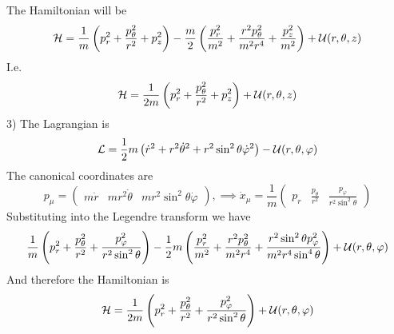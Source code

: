 \documentclass[../admech.tex]{subfiles}
\begin{document}
\begin{exe}[Hamiltonians]
The Hamiltonian will be
\begin{equation*}
	\mathcal{H}=\frac{1}{m}\left( p_r^2+\frac{p_\theta^2}{r^2}+p_z^2 \right)-\frac{m}{2}\left( \frac{p_r^2}{m^2}+\frac{r^2p_\theta^2}{m^2r^4}+\frac{p_z^2}{m^2} \right)+\mathcal{U}(r,\theta,z)
\end{equation*}
I.e.
\begin{equation}
	\mathcal{H}=\frac{1}{2m}\left( p_r^2+\frac{p_\theta^2}{r^2}+p_z^2 \right)+\mathcal{U}(r,\theta,z)
	\label{eq:cylham}
\end{equation}
3) The Lagrangian is
\begin{equation}
	\mathcal{L}=\frac{1}{2}m\left( \dot{r}^2+r^2\dot{\theta}^2+r^2\sin^2\theta\dot{\varphi}^2 \right)-\mathcal{U}(r,\theta,\varphi)
	\label{eq:sphlag}
\end{equation}
The canonical coordinates are
\begin{equation}
	p_\mu=\begin{pmatrix}
		m\dot{r}&mr^2\dot{\theta}&mr^2\sin^2\theta\dot{\varphi}
	\end{pmatrix},\implies\dot{x}_\mu=\frac{1}{m}\begin{pmatrix}
		p_r&\frac{p_\theta}{r^2}&\frac{p_\varphi}{r^2\sin^2\theta}
	\end{pmatrix}
	\label{eq:cancoord}
\end{equation}
Substituting into the Legendre transform we have
\begin{equation}
	\frac{1}{m}\left( p_r^2+\frac{p_\theta^2}{r^2}+\frac{p_\varphi^2}{r^2\sin^2\theta} \right)-\frac{1}{2}m\left( \frac{p_r^2}{m^2}+\frac{r^2p_\theta^2}{m^2r^4}+\frac{r^2\sin^2\theta p_\varphi^2}{m^2r^4\sin^4\theta} \right)+\mathcal{U}(r,\theta,\varphi)
	\label{eq:hamsph1}
\end{equation}
And therefore the Hamiltonian is
\begin{equation}
	\mathcal{H}=\frac{1}{2m}\left( p_r^2+\frac{p_\theta^2}{r^2}+\frac{p_\varphi^2}{r^2\sin^2\theta} \right)+\mathcal{U}(r,\theta,\varphi)
	\label{eq:sphham}
\end{equation}
\end{exe}
\end{document}
